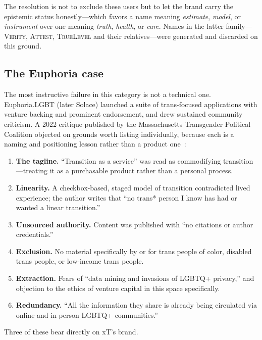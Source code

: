 \documentclass[11pt,a4paper]{article}
\newcommand{\name}[1]{\textsc{#1}}
\begin{document}
The resolution is not to exclude these users but to let the brand carry
the epistemic status honestly---which favors a name meaning
\emph{estimate}, \emph{model}, or \emph{instrument} over one meaning
\emph{truth}, \emph{health}, or \emph{care}. Names in the latter
family---\name{Verity}, \name{Attest}, \name{TrueLevel} and their
relatives---were generated and discarded on this ground.

\subsection{The Euphoria case}
\label{sec:euphoria}

The most instructive failure in this category is not a technical one.
Euphoria.LGBT (later Solace) launched a suite of trans-focused
applications with venture backing and prominent endorsement, and drew
sustained community criticism. A 2022 critique published by the
Massachusetts Transgender Political Coalition objected on grounds
worth listing individually, because each is a naming and positioning
lesson rather than a product one~\cite{mtpc}:

\begin{enumerate}[leftmargin=1.5em,itemsep=0.25em]
\item \textbf{The tagline.} ``Transition as a service'' was read as
      commodifying transition---treating it as a purchasable product
      rather than a personal process.
\item \textbf{Linearity.} A checkbox-based, staged model of transition
      contradicted lived experience; the author writes that ``no trans*
      person I know has had or wanted a linear transition.''
\item \textbf{Unsourced authority.} Content was published with ``no
      citations or author credentials.''
\item \textbf{Exclusion.} No material specifically by or for trans
      people of color, disabled trans people, or low-income trans
      people.
\item \textbf{Extraction.} Fears of ``data mining and invasions of
      LGBTQ+ privacy,'' and objection to the ethics of venture capital
      in this space specifically.
\item \textbf{Redundancy.} ``All the information they share is already
      being circulated via online and in-person LGBTQ+ communities.''
\end{enumerate}

Three of these bear directly on xT's brand.
\end{document}
